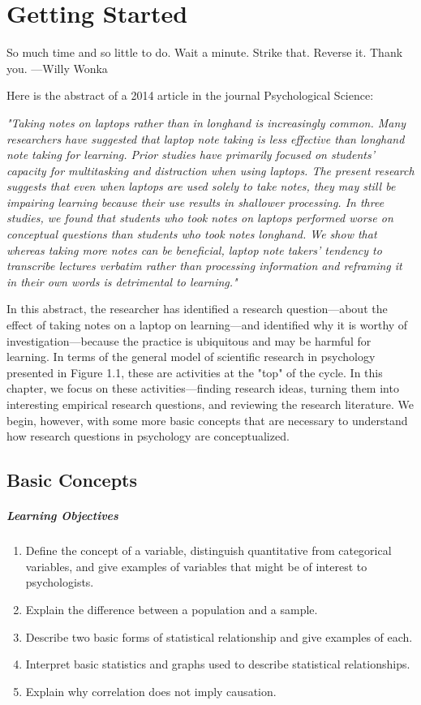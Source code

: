 \chapter{Getting Started}

So much time and so little to do. Wait a minute. Strike that. Reverse it. Thank you.
---Willy Wonka

Here is the abstract of a 2014 article in the journal Psychological Science:

\emph{"Taking notes on laptops rather than in longhand is increasingly common. Many researchers have suggested that laptop note taking is less effective than longhand note taking for learning. Prior studies have primarily focused on students' capacity for multitasking and distraction when using laptops. The present research suggests that even when laptops are used solely to take notes, they may still be impairing learning because their use results in shallower processing. In three studies, we found that students who took notes on laptops performed worse on conceptual questions than students who took notes longhand. We show that whereas taking more notes can be beneficial, laptop note takers' tendency to transcribe lectures verbatim rather than processing information and reframing it in their own words is detrimental to learning."} \citep{mueller_pen_2014}

In this abstract, the researcher has identified a research question---about the effect of taking notes on a laptop on learning---and identified why it is worthy of investigation---because the practice is ubiquitous and may be harmful for learning. In terms of the general model of scientific research in psychology presented in Figure 1.1, these are activities at the "top" of the cycle. In this chapter, we focus on these activities---finding research ideas, turning them into interesting empirical research questions, and reviewing the research literature. We begin, however, with some more basic concepts that are necessary to understand how research questions in psychology are conceptualized.

\section{Basic Concepts}

 \paragraph{Learning Objectives}
 \begin{enumerate}
 \item Define the concept of a variable, distinguish quantitative from categorical variables, and give examples of variables that might be of interest to psychologists.
  \item Explain the difference between a population and a sample.
  \item Describe two basic forms of statistical relationship and give examples of each.
  \item Interpret basic statistics and graphs used to describe statistical relationships.
  \item Explain why correlation does not imply causation.
 \end{enumerate}


